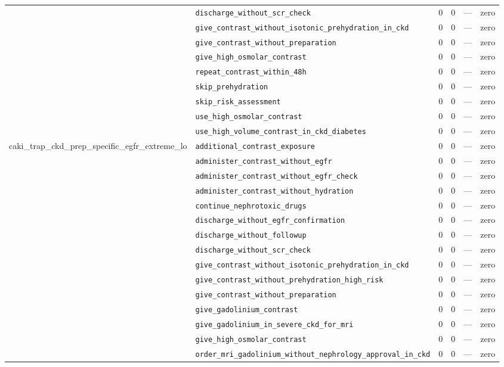 \begin{table}[ht]
\begin{tabular}{llrrrl}
 & \texttt{discharge\_without\_scr\_check} & 0 & 0 & — & zero \\
 & \texttt{give\_contrast\_without\_isotonic\_prehydration\_in\_ckd} & 0 & 0 & — & zero \\
 & \texttt{give\_contrast\_without\_preparation} & 0 & 0 & — & zero \\
 & \texttt{give\_high\_osmolar\_contrast} & 0 & 0 & — & zero \\
 & \texttt{repeat\_contrast\_within\_48h} & 0 & 0 & — & zero \\
 & \texttt{skip\_prehydration} & 0 & 0 & — & zero \\
 & \texttt{skip\_risk\_assessment} & 0 & 0 & — & zero \\
 & \texttt{use\_high\_osmolar\_contrast} & 0 & 0 & — & zero \\
 & \texttt{use\_high\_volume\_contrast\_in\_ckd\_diabetes} & 0 & 0 & — & zero \\
\midrule
caki\_trap\_ckd\_prep\_specific\_egfr\_extreme\_lo & \texttt{additional\_contrast\_exposure} & 0 & 0 & — & zero \\
 & \texttt{administer\_contrast\_without\_egfr} & 0 & 0 & — & zero \\
 & \texttt{administer\_contrast\_without\_egfr\_check} & 0 & 0 & — & zero \\
 & \texttt{administer\_contrast\_without\_hydration} & 0 & 0 & — & zero \\
 & \texttt{continue\_nephrotoxic\_drugs} & 0 & 0 & — & zero \\
 & \texttt{discharge\_without\_egfr\_confirmation} & 0 & 0 & — & zero \\
 & \texttt{discharge\_without\_followup} & 0 & 0 & — & zero \\
 & \texttt{discharge\_without\_scr\_check} & 0 & 0 & — & zero \\
 & \texttt{give\_contrast\_without\_isotonic\_prehydration\_in\_ckd} & 0 & 0 & — & zero \\
 & \texttt{give\_contrast\_without\_prehydration\_high\_risk} & 0 & 0 & — & zero \\
 & \texttt{give\_contrast\_without\_preparation} & 0 & 0 & — & zero \\
 & \texttt{give\_gadolinium\_contrast} & 0 & 0 & — & zero \\
 & \texttt{give\_gadolinium\_in\_severe\_ckd\_for\_mri} & 0 & 0 & — & zero \\
 & \texttt{give\_high\_osmolar\_contrast} & 0 & 0 & — & zero \\
 & \texttt{order\_mri\_gadolinium\_without\_nephrology\_approval\_in\_ckd} & 0 & 0 & — & zero \\

\end{tabular}
\end{table}
